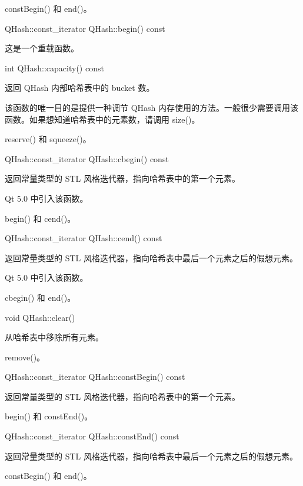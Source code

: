 \begin{seeAlso}
constBegin() 和 end()。
\end{seeAlso}

QHash::const\_iterator QHash::begin() const

这是一个重载函数。

int QHash::capacity() const

返回 QHash 内部哈希表中的 bucket 数。

该函数的唯一目的是提供一种调节 QHash 内存使用的方法。一般很少需要调用该函数。如果想知道哈希表中的元素数，请调用 size()。

\begin{seeAlso}
reserve() 和 squeeze()。
\end{seeAlso}

QHash::const\_iterator QHash::cbegin() const

返回常量类型的 STL 风格迭代器，指向哈希表中的第一个元素。

Qt 5.0 中引入该函数。

\begin{seeAlso}
begin() 和 cend()。
\end{seeAlso}

QHash::const\_iterator QHash::cend() const

返回常量类型的 STL 风格迭代器，指向哈希表中最后一个元素之后的假想元素。

Qt 5.0 中引入该函数。

\begin{seeAlso}
cbegin() 和 end()。
\end{seeAlso}

void QHash::clear()

从哈希表中移除所有元素。

\begin{seeAlso}
remove()。
\end{seeAlso}

QHash::const\_iterator QHash::constBegin() const

返回常量类型的 STL 风格迭代器，指向哈希表中的第一个元素。


\begin{seeAlso}
begin() 和 constEnd()。
\end{seeAlso}

QHash::const\_iterator QHash::constEnd() const

返回常量类型的 STL 风格迭代器，指向哈希表中最后一个元素之后的假想元素。

\begin{seeAlso}
constBegin() 和 end()。
\end{seeAlso}

